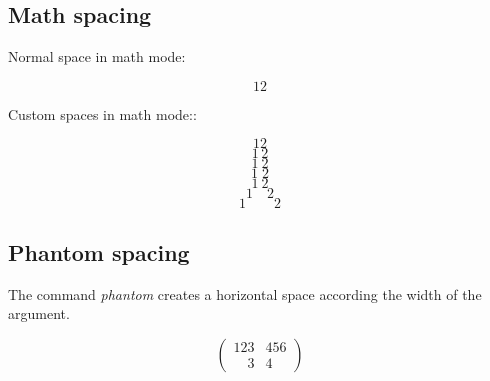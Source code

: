 \documentclass{article}
\begin{document}
\subsection*{Math spacing}
	
Normal space in math mode:

\[1 2\]

Custom spaces in math mode::

\[1\!2\] %
\[1\,2\] %
\[1\:2\] %
\[1\;2\] %
\[1\ 2\] %
\[1\quad2\] %
\[1\qquad2\] %

\subsection*{Phantom spacing}

The command \emph{phantom} creates a horizontal space according the width of the argument.

\[
	\begin{pmatrix}
		123 			& 456\\
		\phantom{12}3	& 4\phantom{56}
	\end{pmatrix}
\]
\end{document}
